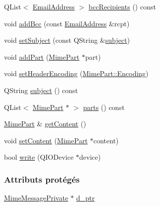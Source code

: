\begin{DoxyCompactItemize}
\item 
Q\+List$<$ \hyperlink{class_simple_mail_1_1_email_address}{Email\+Address} $>$ \hyperlink{class_simple_mail_1_1_mime_message_a160a1f92f2dd26e2154514fa51303db5}{bcc\+Recipients} () const
\item 
void \hyperlink{class_simple_mail_1_1_mime_message_a53d3717ede759eed8244470093e6290a}{add\+Bcc} (const \hyperlink{class_simple_mail_1_1_email_address}{Email\+Address} \&rcpt)
\item 
void \hyperlink{class_simple_mail_1_1_mime_message_a525c33895b322e06c35c0d831cfe9b02}{set\+Subject} (const Q\+String \&\hyperlink{class_simple_mail_1_1_mime_message_a54274861ea83b4b37dd9db80aca34e39}{subject})
\item 
void \hyperlink{class_simple_mail_1_1_mime_message_ae4591e5e94961bd10dfabfd1a89d9fbd}{add\+Part} (\hyperlink{class_simple_mail_1_1_mime_part}{Mime\+Part} $\ast$part)
\item 
void \hyperlink{class_simple_mail_1_1_mime_message_af00bcfef5a681b823002e4efb09d0cdc}{set\+Header\+Encoding} (\hyperlink{class_simple_mail_1_1_mime_part_ae67a2f5406958b95b18bf31a7bbeb5c9}{Mime\+Part\+::\+Encoding})
\item 
Q\+String \hyperlink{class_simple_mail_1_1_mime_message_a54274861ea83b4b37dd9db80aca34e39}{subject} () const
\item 
Q\+List$<$ \hyperlink{class_simple_mail_1_1_mime_part}{Mime\+Part} $\ast$ $>$ \hyperlink{class_simple_mail_1_1_mime_message_a3159d513eb978ea8b764d5defcde12dd}{parts} () const
\item 
\hyperlink{class_simple_mail_1_1_mime_part}{Mime\+Part} \& \hyperlink{class_simple_mail_1_1_mime_message_ab5708266287367c6741e6f2e479a90fb}{get\+Content} ()
\item 
void \hyperlink{class_simple_mail_1_1_mime_message_a489178b096474e20dc068168df42ab15}{set\+Content} (\hyperlink{class_simple_mail_1_1_mime_part}{Mime\+Part} $\ast$content)
\item 
bool \hyperlink{class_simple_mail_1_1_mime_message_ae7fff977d1c558ddc6711416fe0ff723}{write} (Q\+I\+O\+Device $\ast$device)
\end{DoxyCompactItemize}
\subsubsection*{Attributs protégés}
\begin{DoxyCompactItemize}
\item 
\hyperlink{class_simple_mail_1_1_mime_message_private}{Mime\+Message\+Private} $\ast$ \hyperlink{class_simple_mail_1_1_mime_message_abb70ca7430a820f75203dd6bd66cc47f}{d\+\_\+ptr}
\end{DoxyCompactItemize}


